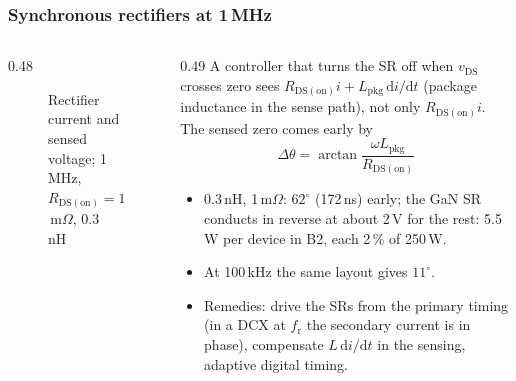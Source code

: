 \begin{frame}
	\frametitle{Synchronous rectifiers at 1\,MHz}
	\begin{columns}[T]
		\begin{column}{0.48\textwidth}
			\begin{figure}
				\centering
				\caption{Rectifier current and sensed voltage; 1\,MHz, $R_\mathrm{DS(on)}=1$\,m$\Omega$, 0.3\,nH}
			\end{figure}
		\end{column}
		\begin{column}{0.49\textwidth}
			\footnotesize
			A controller that turns the SR off when $v_\mathrm{DS}$ crosses zero sees $R_\mathrm{DS(on)}i+L_\mathrm{pkg}\,\mathrm{d}i/\mathrm{d}t$ (package inductance in the sense path), not only $R_\mathrm{DS(on)}i$. The sensed zero comes early by
			\begin{equation*}
				\Delta\theta=\arctan\frac{\omega L_\mathrm{pkg}}{R_\mathrm{DS(on)}}
			\end{equation*}
			\begin{itemize}
				\item 0.3\,nH, 1\,m$\Omega$: $62^\circ$ (172\,ns) early; the GaN SR conducts in reverse at about 2\,V for the rest: 5.5\,W per device in B2, each 2\,\% of 250\,W.
				\item At 100\,kHz the same layout gives $11^\circ$.
				\item Remedies: drive the SRs from the primary timing (in a DCX at $f_\mathrm{r}$ the secondary current is in phase), compensate $L\,\mathrm{d}i/\mathrm{d}t$ in the sensing, adaptive digital timing.
			\end{itemize}
		\end{column}
	\end{columns}
\end{frame}

